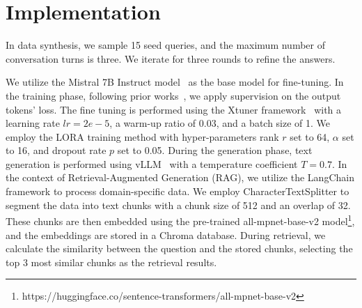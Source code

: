 \appendix
\newpage
\section{Implementation}
\label{sec:imp}
In data synthesis, we sample 15 seed queries, and the maximum number of conversation turns is three. We iterate for three rounds to refine the answers.

We utilize the Mistral 7B Instruct model~\cite{jiang2023mistral} as the base model for fine-tuning. In the training phase, following prior works~\cite{taori2023stanford,Wang2022SelfInstructAL,Xu2023WizardLMEL}, we apply supervision on the output tokens' loss. The fine tuning is performed using the Xtuner framework~\cite{2023xtuner} with a learning rate $lr=2e-5$, a warm-up ratio of 0.03, and a batch size of 1. We employ the LORA training method with hyper-parameters rank $r$ set to 64, $\alpha$ set to 16, and dropout rate $p$ set to 0.05. During the generation phase, text generation is performed using vLLM~\cite{kwon2023efficient} with a temperature coefficient $T=0.7$.
In the context of Retrieval-Augmented Generation (RAG), we utilize the LangChain framework to process domain-specific data. We employ CharacterTextSplitter to segment the data into text chunks with a chunk size of 512 and an overlap of 32. These chunks are then embedded using the pre-trained all-mpnet-base-v2 model\footnote{https://huggingface.co/sentence-transformers/all-mpnet-base-v2}, and the embeddings are stored in a Chroma database. During retrieval, we calculate the similarity between the question and the stored chunks, selecting the top 3 most similar chunks as the retrieval results. 


